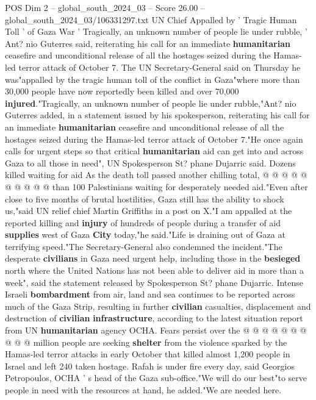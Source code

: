 \begin{textsample}{POS Dim 2 – global\_south\_2024\_03 – Score 26.00 – global\_south\_2024\_03/106331297.txt}  \label{ex:f2_pos_011}
UN Chief Appalled by ' Tragic Human Toll ' of Gaza War ' Tragically, an unknown number of people lie under rubble, ' Ant? nio Guterres said, reiterating his call for an immediate \textbf{humanitarian} ceasefire and unconditional release of all the hostages seized during the Hamas-led terror attack of October 7.
The UN Secretary-General said on Thursday he was"appalled by the tragic human toll of the conflict in Gaza"where more than 30,000 people have now reportedly been killed and over 70,000 \textbf{injured}."Tragically, an unknown number of people lie under rubble,"Ant? nio Guterres added, in a statement issued by his spokesperson, reiterating his call for an immediate \textbf{humanitarian} ceasefire and unconditional release of all the hostages seized during the Hamas-led terror attack of October 7."He once again calls for urgent steps so that critical \textbf{humanitarian} aid can get into and across Gaza to all those in need", UN Spokesperson St? phane Dujarric said.
Dozens killed waiting for aid As the death toll passed another chilling total, @ @ @ @ @ @ @ @ @ @ than 100 Palestinians waiting for desperately needed aid."Even after close to five months of brutal hostilities, Gaza still has the ability to shock us,"said UN relief chief Martin Griffiths in a post on X."I am appalled at the reported killing and \textbf{injury} of hundreds of people during a transfer of aid \textbf{supplies} west of Gaza \textbf{City} today,"he said."Life is draining out of Gaza at terrifying speed."The Secretary-General also condemned the incident."The desperate \textbf{civilians} in Gaza need urgent help, including those in the \textbf{besieged} north where the United Nations has not been able to deliver aid in more than a week", said the statement released by Spokesperson St? phane Dujarric.
Intense Israeli \textbf{bombardment} from air, land and sea continues to be reported across much of the Gaza Strip, resulting in further \textbf{civilian} casualties, displacement and destruction of \textbf{civilian} \textbf{infrastructure}, according to the latest situation report from UN \textbf{humanitarian} agency OCHA.
Fears persist over the @ @ @ @ @ @ @ @ @ @ million people are seeking \textbf{shelter} from the violence sparked by the Hamas-led terror attacks in early October that killed almost 1,200 people in Israel and left 240 taken hostage.
Rafah is under fire every day, said Georgios Petropoulos, OCHA ' s head of the Gaza sub-office."We will do our best"to serve people in need with the resources at hand, he added."We are needed here.

\end{textsample}
